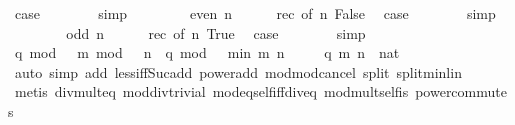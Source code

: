 \begin{isabellebody}
\ {\isacharquery}{\kern0pt}case\isanewline
\ \ \ \ \ \ \isamarkupfalse%
\ simp\isanewline
\ \ \isamarkupfalse%
\isanewline
\ \ \ \ \isamarkupfalse%
\ {\isacharparenleft}{\kern0pt}even\ n{\isacharparenright}{\kern0pt}\isanewline
\ \ \ \ \isamarkupfalse%
\ rec\ {\isacharbrackleft}{\kern0pt}of\ n\ False{\isacharbrackright}{\kern0pt}\ \isamarkupfalse%
\ {\isacharquery}{\kern0pt}case\isanewline
\ \ \ \ \ \ \isamarkupfalse%
\ simp\isanewline
\ \ \isamarkupfalse%
\isanewline
\ \ \ \ \isamarkupfalse%
\ {\isacharparenleft}{\kern0pt}odd\ n{\isacharparenright}{\kern0pt}\isanewline
\ \ \ \ \isamarkupfalse%
\ rec\ {\isacharbrackleft}{\kern0pt}of\ n\ True{\isacharbrackright}{\kern0pt}\ \isamarkupfalse%
\ {\isacharquery}{\kern0pt}case\isanewline
\ \ \ \ \ \ \isamarkupfalse%
\ simp\isanewline
\ \ \isamarkupfalse%
\isanewline
\ \ \isamarkupfalse%
\ {\isacartoucheopen}q\ mod\ {}\ {\isacharcircum}{\kern0pt}\ m\ mod\ {}\ {\isacharcircum}{\kern0pt}\ n\ {\isacharequal}{\kern0pt}\ q\ mod\ {}\ {\isacharcircum}{\kern0pt}\ min\ m\ n{\isacartoucheclose}\isanewline
\ \ \ \ \ q\ m\ n\ {\isacharcolon}{\kern0pt}{\isacharcolon}{\kern0pt}\ nat\isanewline
\ \ \ \ \isamarkupfalse%
\ {\isacharparenleft}{\kern0pt}auto\ simp\ add{\isacharcolon}{\kern0pt}\ less{\isacharunderscore}{\kern0pt}iff{\isacharunderscore}{\kern0pt}Suc{\isacharunderscore}{\kern0pt}add\ power{\isacharunderscore}{\kern0pt}add\ mod{\isacharunderscore}{\kern0pt}mod{\isacharunderscore}{\kern0pt}cancel\ split{\isacharcolon}{\kern0pt}\ split{\isacharunderscore}{\kern0pt}min{\isacharunderscore}{\kern0pt}lin{\isacharparenright}{\kern0pt}\isanewline
\ \ \ \ \isamarkupfalse%
\ {\isacharparenleft}{\kern0pt}metis\ div{\isacharunderscore}{\kern0pt}mult{}{\isacharunderscore}{\kern0pt}eq\ mod{\isacharunderscore}{\kern0pt}div{\isacharunderscore}{\kern0pt}trivial\ mod{\isacharunderscore}{\kern0pt}eq{\isacharunderscore}{\kern0pt}self{\isacharunderscore}{\kern0pt}iff{\isacharunderscore}{\kern0pt}div{\isacharunderscore}{\kern0pt}eq{\isacharunderscore}{\kern0pt}{}\ mod{\isacharunderscore}{\kern0pt}mult{\isacharunderscore}{\kern0pt}self{}{\isacharunderscore}{\kern0pt}is{\isacharunderscore}{\kern0pt}{}\ power{\isacharunderscore}{\kern0pt}commutes{\isacharparenright}{\kern0pt}\isanewline
\ \ \ \ \isamarkupfalse%

\end{isabellebody}
